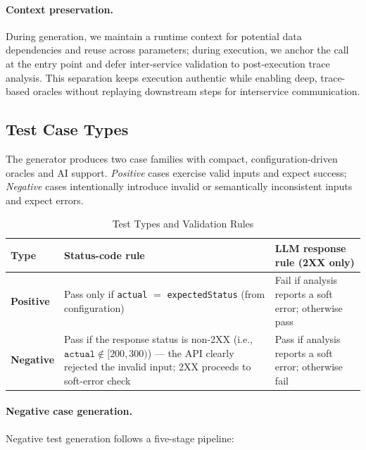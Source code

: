 \documentclass[conference]{IEEEtran}
\begin{document}
\paragraph{Context preservation.}
During generation, we maintain a runtime context for potential data dependencies and reuse across parameters; during execution, we anchor the call at the entry point and defer inter-service validation to post-execution trace analysis. This separation keeps execution authentic while enabling deep, trace-based oracles without replaying downstream steps for interservice communication.



\subsection{Test Case Types}\label{ssec:test-types}
The generator produces two case families with compact, configuration-driven oracles and AI support. \emph{Positive} cases exercise valid inputs and expect success; \emph{Negative} cases intentionally introduce invalid or semantically inconsistent inputs and expect errors.

\begin{table}[t]
\centering
\caption{Test Types and Validation Rules}
\label{tab:test-types}
\renewcommand{\arraystretch}{1.15}\setlength{\tabcolsep}{4pt}
\begin{tabularx}{\columnwidth}{>{\bfseries}p{} X X}
\toprule
Type & Status-code rule & LLM response rule (2XX only) \\
\midrule
Positive & Pass only if \texttt{actual} $=$ \texttt{expectedStatus} (from configuration) & Fail if analysis reports a soft error; otherwise pass \\
Negative & Pass if the response status is non-2XX (i.e., $\texttt{actual} \notin [200, 300)$) --- the API clearly rejected the invalid input; 2XX proceeds to soft-error check & Pass if analysis reports a soft error; otherwise fail \\
\bottomrule
\end{tabularx}
\end{table}

\paragraph{Negative case generation.}\label{ssec:negtest}
\noindent Negative test generation follows a five-stage pipeline:
\end{document}
